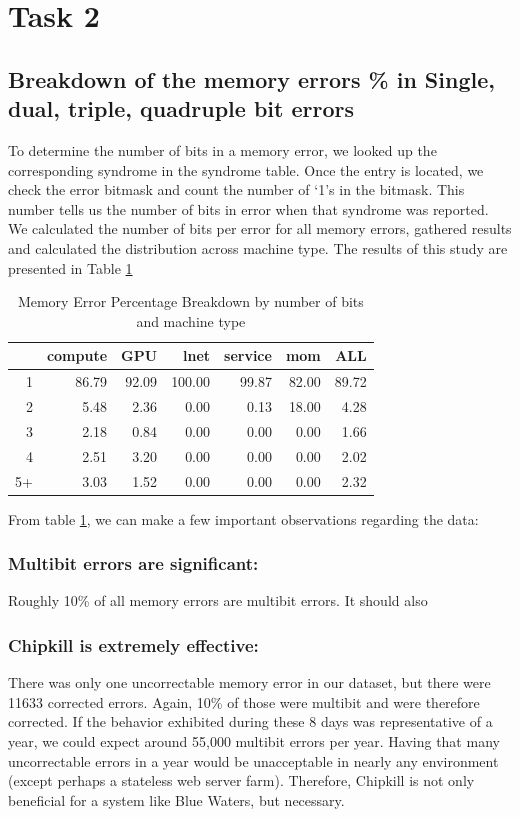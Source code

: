 \section{Task 2}

\subsection{Breakdown of the memory errors \% in Single, dual, triple, quadruple bit errors}

To determine the number of bits in a memory error, we looked up the
corresponding syndrome in the syndrome table.  Once the entry is located, we
check the error bitmask and count the number of `1's in the bitmask.  This
number tells us the number of bits in error when that syndrome was
reported\cite{AMD_BKDG}.  We calculated the number of bits per error for all
memory errors, gathered results and calculated the distribution across machine
type. The results of this study are presented in Table \ref{tab:mem_breakdown}

\begin{table}[ht]
\centering
\caption{Memory Error Percentage Breakdown by number of bits and machine type}
\label{tab:mem_breakdown}
\begin{tabular}{rrrrrrr}
  \hline
 & compute & GPU & lnet & service & mom & ALL \\
  \hline
1 & 86.79 & 92.09 & 100.00 & 99.87 & 82.00 & 89.72 \\
  2 & 5.48 & 2.36 & 0.00 & 0.13 & 18.00 & 4.28 \\
  3 & 2.18 & 0.84 & 0.00 & 0.00 & 0.00 & 1.66 \\
  4 & 2.51 & 3.20 & 0.00 & 0.00 & 0.00 & 2.02 \\
  5+ & 3.03 & 1.52 & 0.00 & 0.00 & 0.00 & 2.32 \\
   \hline
\end{tabular}
\end{table}

From table \ref{tab:mem_breakdown}, we can make a few important observations regarding the data:
\subsubsection{Multibit errors are significant:} Roughly 10\% of all memory
errors are multibit errors.  It should also  

\subsubsection{Chipkill is extremely effective:}  There was only one
uncorrectable memory error in our dataset, but there were 11633 corrected
errors.  Again, 10\% of those were multibit and were therefore corrected.  If
the behavior exhibited during these 8 days was representative of a year, we
could expect around 55,000 multibit errors per year. Having that many
uncorrectable errors in a year would be unacceptable in nearly any environment
(except perhaps a stateless web server farm).  Therefore, Chipkill is not only
beneficial for a system like Blue Waters, but necessary.

